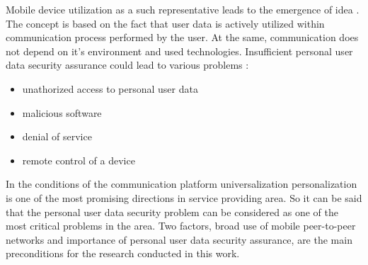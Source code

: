 %
Mobile device utilization as a such representative leads to the emergence of  idea . 
%
The  concept is based on the fact that user data is actively utilized within communication process performed by the user. 
%
At the same, communication does not depend on it's environment and used technologies. 
%
Insufficient personal user data security assurance could lead to various problems :
\begin{itemize}
	\item unathorized access to personal user data
	\item malicious software 
	\item denial of service
	\item remote control of a device
\end{itemize}

%
In the conditions of the communication platform universalization\T{,} personalization is one of the most promising directions in service providing area. 
%
So it can be said that the personal user data security problem can be considered as one of the most critical problems in the area. 
%
Two factors, broad use of mobile peer-to-peer networks and importance of personal user data security assurance, are the main preconditions for the research conducted in this work. 